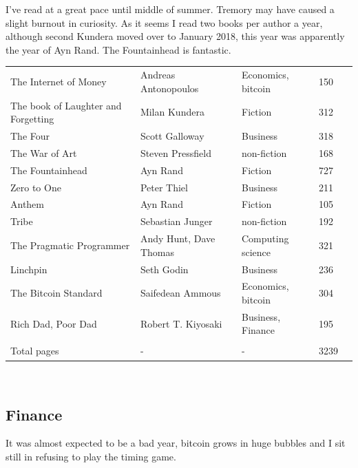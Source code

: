 \documentclass[a4paper]{article}
\begin{document}
I've read at a great pace until middle of summer. Tremory may have caused a slight burnout in curiosity. 
As it seems I read two books per author a year, although second Kundera moved over to January 2018, 
this year was apparently the year of Ayn Rand. The Fountainhead is fantastic. 

\begin{tabular}{l|l|l|l|l}
The Internet of Money & Andreas Antonopoulos & Economics, bitcoin & 150 \\
The book of Laughter and Forgetting & Milan Kundera & Fiction & 312 \\
The Four & Scott Galloway & Business & 318 \\
The War of Art & Steven Pressfield & non-fiction & 168 \\
The Fountainhead & Ayn Rand & Fiction & 727 \\
Zero to One & Peter Thiel & Business & 211 \\
Anthem & Ayn Rand & Fiction & 105 \\
Tribe & Sebastian Junger & non-fiction & 192 \\
The Pragmatic Programmer & Andy Hunt, Dave Thomas & Computing science & 321 \\
Linchpin & Seth Godin & Business & 236 \\
The Bitcoin Standard & Saifedean Ammous & Economics, bitcoin & 304 \\
Rich Dad, Poor Dad & Robert T. Kiyosaki & Business, Finance & 195 \\ 
\\
Total pages & - & - & 3239
\end{tabular} \\

\subsection{Finance}

It was almost expected to be a bad year, bitcoin grows in huge bubbles and I sit still in refusing to play the timing game.
\end{document}
